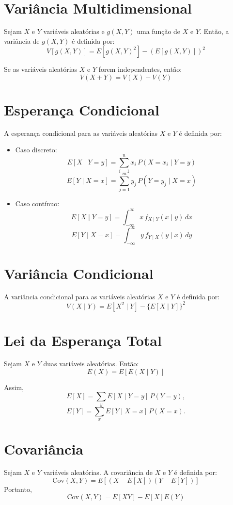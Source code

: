 \documentclass{article}
\begin{document}
\section{Variância Multidimensional}
Sejam $X$ e $Y$ variáveis aleatórias e $g(X,Y)$ uma função de $X$ e $Y$.
Então, a variância de $g(X,Y)$ é definida por:
    $$
    V[g(X,Y)] = E\left[ g(X,Y)^2 \right] - \left( E[g(X,Y)] \right)^2
    $$

Se as variáveis aleatórias $X$ e $Y$ forem independentes, então:
    $$
    V(X + Y) = V(X) + V(Y)
    $$

\section{Esperança Condicional}
A esperança condicional para as variáveis aleatórias $X$ e $Y$ é definida por:

\begin{itemize}
    \item Caso discreto:
        $$
        E[X \mid Y = y] = \sum_{i=1}^{n} x_i \, P(X = x_i \mid Y = y)
        $$
        $$
        E[Y \mid X = x] = \sum_{j=1}^{m} y_j \, P(Y = y_j \mid X = x)
        $$
    \item Caso contínuo:
        $$
        E[X \mid Y = y] = \int_{-\infty}^{\infty} x \, f_{X\mid Y}(x \mid y) \, dx
        $$
        $$
        E[Y \mid X = x] = \int_{-\infty}^{\infty} y \, f_{Y\mid X}(y \mid x) \, dy
        $$
\end{itemize}

\section{Variância Condicional}
A variância condicional para as variáveis aleatórias $X$ e $Y$ é definida por:
    $$
    V(X \mid Y) = E[X^2 \mid Y] - \{ E[X \mid Y] \}^2
    $$

\section{Lei da Esperança Total}
Sejam $X$ e $Y$ duas variáveis aleatórias. Então:
    $$
    E(X) = E\left[ E(X \mid Y) \right]
    $$

Assim, 
    $$
    E[X] = \sum_{y} E[X \mid Y = y] \, P(Y = y),
    $$
    $$
    E[Y] = \sum_{x} E[Y \mid X = x] \, P(X = x).
    $$

\section{Covariância}
Sejam $X$ e $Y$ variáveis aleatórias. A covariância de $X$ e $Y$ é definida por:
    $$
    \mathrm{Cov}(X, Y) = E\left[(X - E\left[X\right])(Y - E\left[Y\right])\right]
    $$
Portanto,
    $$
    \mathrm{Cov}(X, Y) = E\left[XY\right] - E\left[X\right]E(Y)
    $$
\end{document}
